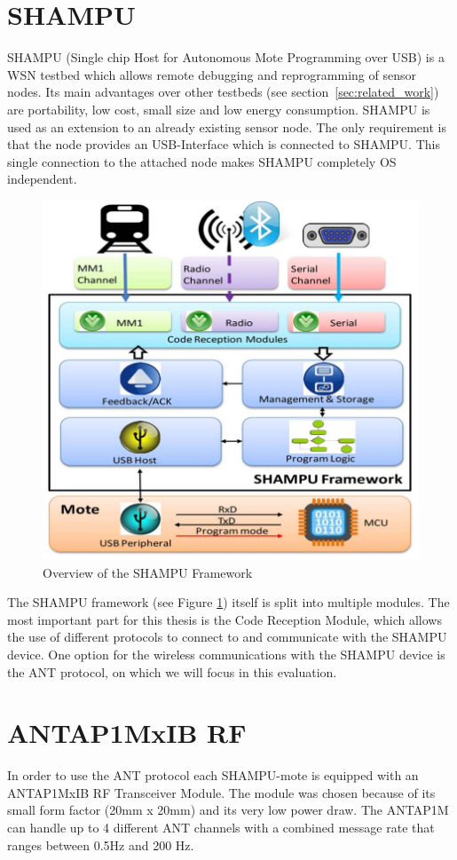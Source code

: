 \section{SHAMPU}
SHAMPU (Single chip Host for Autonomous Mote Programming over USB) \cite{Smeets:2014:DAL:2602339.2602401} is a WSN testbed which allows remote debugging and reprogramming of sensor nodes. Its main advantages over other testbeds (see section~\ref{sec:related_work}) are portability, low cost, small size and low energy consumption. SHAMPU is used as an extension to an already existing sensor node. The only requirement is that the node provides an USB-Interface which is connected to SHAMPU. This single connection to the attached node makes SHAMPU completely OS independent.
\begin{figure}[H]
\centering
\includegraphics[scale=.5]{./pics/SHAMPUframework.png}
\caption{Overview of the SHAMPU Framework \cite{Smeets:2014:DAL:2602339.2602401}}\label{fig:shampuframework}
\end{figure}
The SHAMPU framework (see Figure \ref{fig:shampuframework}) itself is split into multiple modules. The most important part for this thesis is the Code Reception Module, which allows the use of different protocols to connect to and communicate with the SHAMPU device. One option for the wireless communications with the SHAMPU device is the ANT protocol, on which we will focus in this evaluation.

\section{ANTAP1MxIB RF}
In order to use the ANT protocol each SHAMPU-mote is equipped with an ANTAP1MxIB RF Transceiver Module. The module was chosen because of its small form factor (20mm x 20mm) and its very low power draw. The ANTAP1M can handle up to 4 different ANT channels with a combined message rate that ranges between 0.5Hz and 200 Hz. 

